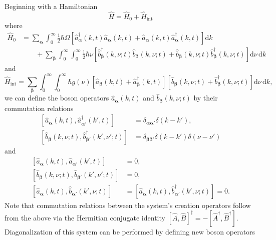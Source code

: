 \documentclass{article}
\begin{document}
Beginning with a Hamiltonian
\begin{equation}
\hat{H} = \hat{H}_0 + \hat{H}_\mathrm{int}
\end{equation}
where 
\begin{equation}
\begin{split}
\hat{H}_0 &= \sum_{\bm{\alpha}}\int_0^\infty\frac{1}{2}\hbar\Omega\left[\hat{a}_{\bm{\alpha}}^\dagger(k,t)\hat{a}_{\bm{\alpha}}(k,t) + \hat{a}_{\bm{\alpha}}(k,t)\hat{a}_{\bm{\alpha}}^\dagger(k,t)\right]\mathrm{d}k\\
&\qquad + \sum_{\bm{\beta}}\int_0^\infty\int_0^\infty\frac{1}{2}\hbar\nu\left[\hat{b}_{\bm{\beta}}^\dagger(k,\nu;t)\hat{b}_{\bm{\beta}}(k,\nu;t) + \hat{b}_{\bm{\beta}}(k,\nu;t)\hat{b}_{\bm{\beta}}^\dagger(k,\nu;t)\right]\mathrm{d}\nu\,\mathrm{d}k
\end{split}
\end{equation}
and
\begin{equation}
\hat{H}_\mathrm{int} = \sum_{\bm{\beta}}\int_0^\infty\int_0^\infty \hbar g(\nu)\left[\hat{a}_{\bm{\beta}}(k,t) + \hat{a}_{\bm{\beta}}^\dagger(k,t)\right]\left[\hat{b}_{\bm{\beta}}(k,\nu;t) + \hat{b}_{\bm{\beta}}^\dagger(k,\nu;t)\right]\mathrm{d}\nu\,\mathrm{d}k,
\end{equation}
we can define the boson operators $\hat{a}_{\bm{\alpha}}(k,t)$ and $\hat{b}_{\bm{\beta}}(k,\nu;t)$ by their commutation relations
\begin{equation}
\begin{split}
\left[\hat{a}_{\bm{\alpha}}(k,t),\hat{a}_{\bm{\alpha}'}^\dagger(k',t)\right] &= \delta_{\bm{\alpha}\bm{\alpha}'}\delta(k - k'),\\
\left[\hat{b}_{\bm{\beta}}(k,\nu;t),\hat{b}_{\bm{\beta}'}^\dagger(k',\nu';t)\right] &= \delta_{\bm{\beta}\bm{\beta}'}\delta(k - k')\delta(\nu - \nu')
\end{split}
\end{equation}
and
\begin{equation}
\begin{split}
\left[\hat{a}_{\bm{\alpha}}(k,t),\hat{a}_{\bm{\alpha}'}(k',t)\right] &= 0,\\
\left[\hat{b}_{\bm{\beta}}(k,\nu;t),\hat{b}_{\bm{\beta}'}(k',\nu';t)\right] &= 0,\\
\left[\hat{a}_{\bm{\alpha}}(k,t),\hat{b}_{\bm{\alpha}'}(k',\nu;t)\right] &= \left[\hat{a}_{\bm{\alpha}}(k,t),\hat{b}_{\bm{\alpha}'}^\dagger(k',\nu;t)\right] = 0.
\end{split}
\end{equation}
Note that commutation relations between the system's creation operators follow from the above via the Hermitian conjugate identity $[\hat{A},\hat{B}]^\dagger = -[\hat{A}^\dagger,\hat{B}^\dagger]$. Diagonalization of this system can be performed by defining new boson operators
\end{document}
